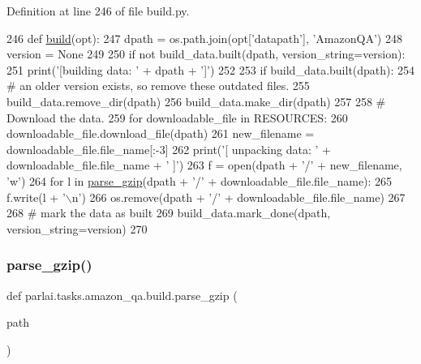 Definition at line 246 of file build.\+py.


\begin{DoxyCode}
246 \textcolor{keyword}{def }\hyperlink{namespacedialog__babi__feedback_1_1build_a7a9d289f7493a5ded13c4b7f071b6184}{build}(opt):
247     dpath = os.path.join(opt[\textcolor{stringliteral}{'datapath'}], \textcolor{stringliteral}{'AmazonQA'})
248     version = \textcolor{keywordtype}{None}
249 
250     \textcolor{keywordflow}{if} \textcolor{keywordflow}{not} build\_data.built(dpath, version\_string=version):
251         print(\textcolor{stringliteral}{'[building data: '} + dpath + \textcolor{stringliteral}{']'})
252 
253         \textcolor{keywordflow}{if} build\_data.built(dpath):
254             \textcolor{comment}{# an older version exists, so remove these outdated files.}
255             build\_data.remove\_dir(dpath)
256         build\_data.make\_dir(dpath)
257 
258         \textcolor{comment}{# Download the data.}
259         \textcolor{keywordflow}{for} downloadable\_file \textcolor{keywordflow}{in} RESOURCES:
260             downloadable\_file.download\_file(dpath)
261             new\_filename = downloadable\_file.file\_name[:-3]
262             print(\textcolor{stringliteral}{'[ unpacking data: '} + downloadable\_file.file\_name + \textcolor{stringliteral}{' ]'})
263             f = open(dpath + \textcolor{stringliteral}{'/'} + new\_filename, \textcolor{stringliteral}{'w'})
264             \textcolor{keywordflow}{for} l \textcolor{keywordflow}{in} \hyperlink{namespaceparlai_1_1tasks_1_1amazon__qa_1_1build_a4dc970e3684ff021439ed7e158c4da35}{parse\_gzip}(dpath + \textcolor{stringliteral}{'/'} + downloadable\_file.file\_name):
265                 f.write(l + \textcolor{stringliteral}{'\(\backslash\)n'})
266             os.remove(dpath + \textcolor{stringliteral}{'/'} + downloadable\_file.file\_name)
267 
268         \textcolor{comment}{# mark the data as built}
269         build\_data.mark\_done(dpath, version\_string=version)
270 \end{DoxyCode}
\mbox{\label{namespaceparlai_1_1tasks_1_1amazon__qa_1_1build_a4dc970e3684ff021439ed7e158c4da35}} 
\subsubsection{\texorpdfstring{parse\+\_\+gzip()}{parse\_gzip()}}
{\footnotesize\ttfamily def parlai.\+tasks.\+amazon\+\_\+qa.\+build.\+parse\+\_\+gzip (\begin{DoxyParamCaption}\item[{}]{path }\end{DoxyParamCaption})}



